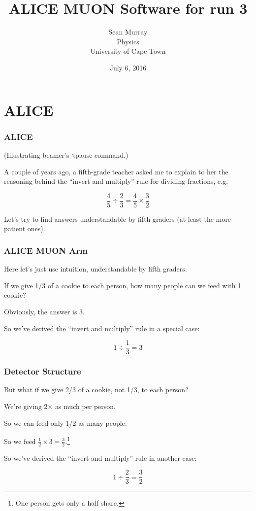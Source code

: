 \documentclass{beamer}
\title{ALICE MUON Software for run 3}
\author{Sean Murray \\
    Physics \\
    University of Cape Town 
}
\date{July 6, 2016}
\begin{document}
\begin{frame}
\titlepage
\end{frame}

\section{ALICE}

\begin{frame}
\frametitle{ALICE}

(Illustrating {\sc beamer}'s $\backslash$pause command.)
\vskip 0.5in

A couple of years ago, a fifth-grade teacher asked me to explain to her
the reasoning behind the ``invert and multiply'' rule for dividing
fractions, e.g.
\pause  %

$$
\frac{4}{5} \div \frac{2}{3} = \frac{4}{5} \times \frac{3}{2}
$$

\pause

Let's try to find answers understandable by fifth graders (at least the
more patient ones).

\end{frame}

\begin{frame}
\frametitle{ALICE MUON Arm}

Here let's just use intuition, understandable by fifth graders.

\pause

If we give 1/3 of a cookie to each person, how many people can we
feed with 1 cookie?  

\pause

Obviously, the answer is 3.

So we've derived the ``invert and multiply'' rule in a special case:

$$
1 \div \frac{1}{3} = 3
$$

\end{frame}

\begin{frame}
\frametitle{Detector Structure}

But what if we give 2/3 of a cookie, not 1/3, to each person?  

We're giving 2$\times$ as much per person. 

So we can feed only 1/2 as many people. 

So we feed  $\frac{1}{2} \times 3 = \frac{3}{2}$.\footnote{One person
gets only a half share.}

So we've derived the ``invert and multiply'' rule in another case:

$$
1 \div \frac{2}{3} = \frac{3}{2}
$$

\end{frame}
\end{document}
